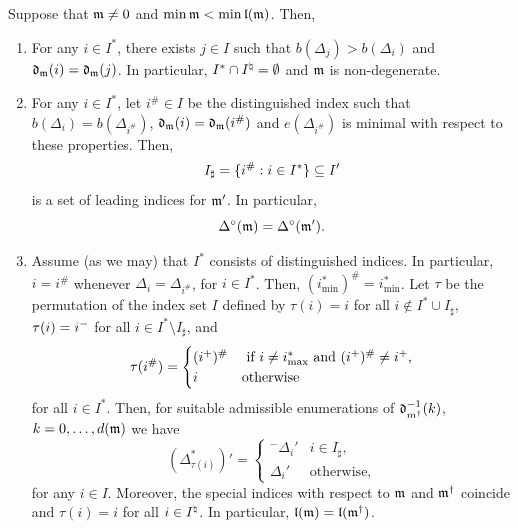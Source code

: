 \documentclass{ert-l} %
\begin{document}
\begin{proposition} \label{lem: main2}
Suppose that $\mathfrak{m}\ne0$ and $\min\mathfrak{m}<\min\mathfrak{l}(\mathfrak{m})$. Then,
\begin{enumerate}
\item For any $i\in I^*$, there exists $j \in I$ such that $b(\Delta_j)>b(\Delta_i)$
and $\mathfrak{d}_{\mathfrak{m}}(i)=\mathfrak{d}_{\mathfrak{m}}(j)$. In particular, $I^*\cap I^{\natural}=\emptyset$ and $\mathfrak{m}$ is non-degenerate.
\item \label{part: cm1} For any $i\in I^*$, let $i^\#\in I$ be the distinguished index such that $b(\Delta_i)=b(\Delta_{i^\#})$,
$\mathfrak{d}_{\mathfrak{m}}(i)=\mathfrak{d}_{\mathfrak{m}}(i^\#)$ and $e(\Delta_{i^\#})$ is minimal with respect to these properties.
Then,
\[
I_{\sharp}=\{i^\#:i\in I^*\}\subseteq I'
\]
is a set of leading indices for $\mathfrak{m}'$. In particular,
\[
\Delta^{\circ}(\mathfrak{m})=\Delta^{\circ}(\mathfrak{m}').
\]
\item Assume (as we may) that $I^*$ consists of distinguished indices. In particular, $i=i^\#$
whenever $\Delta_i=\Delta_{i^\#}$, for $i\in I^*$. Then, $(i^*_{\min})^\#=i^*_{\min}$.
Let $\tau$ be the permutation of the index set $I$ defined by $\tau(i)=i$ for all $i\notin I^*\cup I_{\sharp}$,
$\tau(i)=i^-$ for all $i\in I^*\setminus I_{\sharp}$, and
\[
\tau(i^\#)=\begin{cases}(i^+)^\#&\text{ if }i\ne i^*_{\max}\text{ and }(i^+)^\#\neq i^+ ,\\
i&\text{otherwise}\end{cases}
\]
for all $i\in I^*$.
Then, for suitable admissible enumerations of $\mathfrak{d}_{m^{\dagger}}^{-1}(k)$, $k=0,\dots,d(\mathfrak{m})$ we
have
\begin{equation} \label{eq: deltau}
(\Delta_{\tau(i)}^*)'=\begin{cases}{}^-\Delta_i'&i\in I_{\sharp},\\
\Delta_i'&\text{otherwise,}\end{cases}
\end{equation}
for any $i\in I$. Moreover, the special indices with respect to $\mathfrak{m}$ and $\mathfrak{m}^{\dagger}$ coincide
and $\tau(i)=i$ for all $i\in I^{\natural}$. In particular, $\mathfrak{l}(\mathfrak{m}) = \mathfrak{l}(\mathfrak{m}^{\dagger})$.
\end{enumerate}
\end{proposition}
\end{document}
